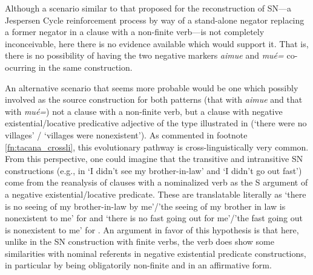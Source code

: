 \documentclass[output=paper]{langsci/langscibook}
\begin{document}
Although a scenario similar to that proposed for the reconstruction of
SN---a Jespersen Cycle reinforcement process by way of a stand-alone
negator replacing a former negator in a clause with a non-finite verb---is
not completely inconceivable, here there is no evidence available which
would support it. That is, there is no possibility of having the two
negative markers \textit{aimue} and \textit{mué=} co-ocurring in the same
construction.

An alternative scenario that seems more probable would be one
which possibly involved as the source construction for both patterns (that
with \textit{aimue} and that with \textit{mué=}) not a clause with a
non-finite verb, but a clause with negative existential\slash locative
predicative adjective of the type illustrated in
 (`there were no villages' / `villages were nonexistent'). As commented in footnote \ref{fn:tacana_crossli}, this evolutionary
pathway is cross-linguistically very common. From this perspective, one
could imagine that the transitive and intransitive SN constructions (e.g.,
in  `I didn't see my brother-in-law' and
 `I didn't go out fast') come from the reanalysis
of clauses with a nominalized verb as the S argument of a negative
existential\slash locative predicate. These are translatable literally as `there is
no seeing of my brother-in-law by me'\slash 'the seeing of my brother in law is nonexistent to me' for  and
`there is no fast going out for me'\slash 'the fast going out is nonexistent to me' for . An argument in favor of this hypothesis is that here, unlike
in the SN construction with finite verbs, the verb does show some
similarities with nominal referents in negative existential predicate
constructions, in particular by being obligatorily non-finite and in an
affirmative form.
\end{document}
